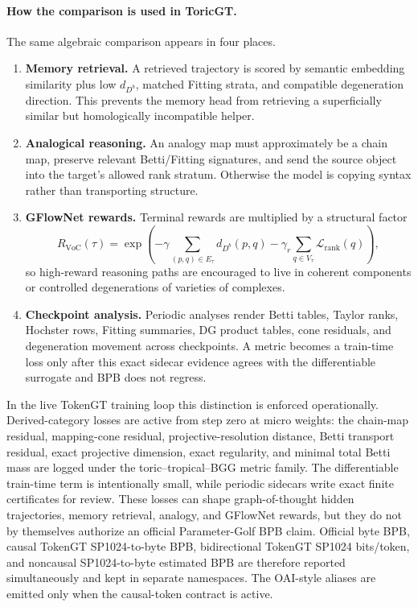 \documentclass[11pt]{article}
\theoremstyle{definition}
\theoremstyle{plain}
\theoremstyle{remark}
\numberwithin{equation}{section}
\begin{document}
\paragraph{How the comparison is used in ToricGT.}
The same algebraic comparison appears in four places.
\begin{enumerate}[leftmargin=2em]
  \item \textbf{Memory retrieval.}  A retrieved trajectory is scored by semantic embedding similarity plus low $d_{D^b}$, matched Fitting strata, and compatible degeneration direction.  This prevents the memory head from retrieving a superficially similar but homologically incompatible helper.
  \item \textbf{Analogical reasoning.}  An analogy map must approximately be a chain map, preserve relevant Betti/Fitting signatures, and send the source object into the target's allowed rank stratum.  Otherwise the model is copying syntax rather than transporting structure.
  \item \textbf{GFlowNet rewards.}  Terminal rewards are multiplied by a structural factor
  \begin{equation}
    R_{\mathrm{VoC}}(\tau)=
    \exp\left(-\gamma\sum_{(p,q)\in E_\tau}d_{D^b}(p,q)
               -\gamma_r\sum_{q\in V_\tau}\mathcal L_{\mathrm{rank}}(q)\right),
  \end{equation}
  so high-reward reasoning paths are encouraged to live in coherent components or controlled degenerations of varieties of complexes.
  \item \textbf{Checkpoint analysis.}  Periodic analyses render Betti tables, Taylor ranks, Hochster rows, Fitting summaries, DG product tables, cone residuals, and degeneration movement across checkpoints.  A metric becomes a train-time loss only after this exact sidecar evidence agrees with the differentiable surrogate and BPB does not regress.
\end{enumerate}

In the live TokenGT training loop this distinction is enforced operationally.
Derived-category losses are active from step zero at micro weights: the
chain-map residual, mapping-cone residual, projective-resolution distance,
Betti transport residual, exact projective dimension, exact regularity, and
minimal total Betti mass are logged under the toric--tropical--BGG metric
family.  The differentiable train-time term is intentionally small, while
periodic sidecars write exact finite certificates for review.  These losses
can shape graph-of-thought hidden trajectories, memory retrieval, analogy, and
GFlowNet rewards, but they do not by themselves authorize an official
Parameter-Golf BPB claim.  Official byte BPB, causal TokenGT SP1024-to-byte
BPB, bidirectional TokenGT SP1024 bits/token, and noncausal SP1024-to-byte
estimated BPB are therefore reported simultaneously and kept in separate
namespaces.  The OAI-style aliases are emitted only when the causal-token
contract is active.
\end{document}
